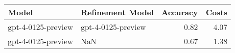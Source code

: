 \begin{tabular}{llrr}
\toprule
Model & Refinement Model & Accuracy & Costs \\
\midrule
gpt-4-0125-preview & gpt-4-0125-preview & 0.82 & 4.07 \\
gpt-4-0125-preview & NaN & 0.67 & 1.38 \\
\bottomrule
\end{tabular}
